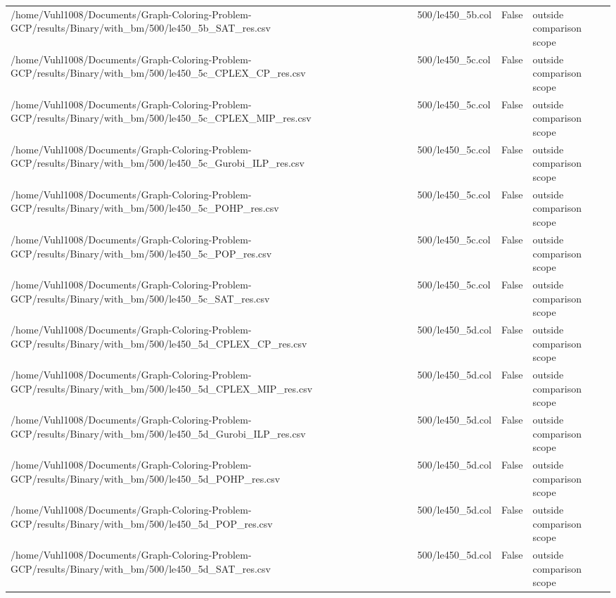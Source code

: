 \begin{table}[htbp]
\begin{tabular}{llll}
/home/Vuhl1008/Documents/Graph-Coloring-Problem-GCP/results/Binary/with\_bm/500/le450\_5b\_SAT\_res.csv & 500/le450\_5b.col & False & outside comparison scope \\
/home/Vuhl1008/Documents/Graph-Coloring-Problem-GCP/results/Binary/with\_bm/500/le450\_5c\_CPLEX\_CP\_res.csv & 500/le450\_5c.col & False & outside comparison scope \\
/home/Vuhl1008/Documents/Graph-Coloring-Problem-GCP/results/Binary/with\_bm/500/le450\_5c\_CPLEX\_MIP\_res.csv & 500/le450\_5c.col & False & outside comparison scope \\
/home/Vuhl1008/Documents/Graph-Coloring-Problem-GCP/results/Binary/with\_bm/500/le450\_5c\_Gurobi\_ILP\_res.csv & 500/le450\_5c.col & False & outside comparison scope \\
/home/Vuhl1008/Documents/Graph-Coloring-Problem-GCP/results/Binary/with\_bm/500/le450\_5c\_POHP\_res.csv & 500/le450\_5c.col & False & outside comparison scope \\
/home/Vuhl1008/Documents/Graph-Coloring-Problem-GCP/results/Binary/with\_bm/500/le450\_5c\_POP\_res.csv & 500/le450\_5c.col & False & outside comparison scope \\
/home/Vuhl1008/Documents/Graph-Coloring-Problem-GCP/results/Binary/with\_bm/500/le450\_5c\_SAT\_res.csv & 500/le450\_5c.col & False & outside comparison scope \\
/home/Vuhl1008/Documents/Graph-Coloring-Problem-GCP/results/Binary/with\_bm/500/le450\_5d\_CPLEX\_CP\_res.csv & 500/le450\_5d.col & False & outside comparison scope \\
/home/Vuhl1008/Documents/Graph-Coloring-Problem-GCP/results/Binary/with\_bm/500/le450\_5d\_CPLEX\_MIP\_res.csv & 500/le450\_5d.col & False & outside comparison scope \\
/home/Vuhl1008/Documents/Graph-Coloring-Problem-GCP/results/Binary/with\_bm/500/le450\_5d\_Gurobi\_ILP\_res.csv & 500/le450\_5d.col & False & outside comparison scope \\
/home/Vuhl1008/Documents/Graph-Coloring-Problem-GCP/results/Binary/with\_bm/500/le450\_5d\_POHP\_res.csv & 500/le450\_5d.col & False & outside comparison scope \\
/home/Vuhl1008/Documents/Graph-Coloring-Problem-GCP/results/Binary/with\_bm/500/le450\_5d\_POP\_res.csv & 500/le450\_5d.col & False & outside comparison scope \\
/home/Vuhl1008/Documents/Graph-Coloring-Problem-GCP/results/Binary/with\_bm/500/le450\_5d\_SAT\_res.csv & 500/le450\_5d.col & False & outside comparison scope \\

\end{tabular}
\end{table}
